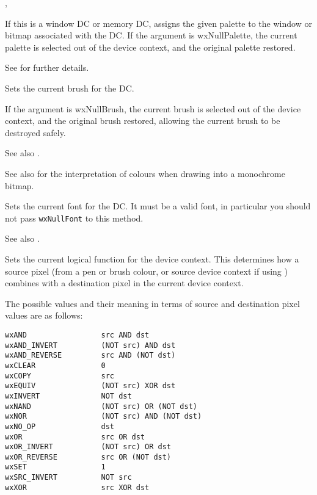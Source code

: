 
, 

\label{wxdcsetpalette}


If this is a window DC or memory DC, assigns the given palette to the window
or bitmap associated with the DC. If the argument is wxNullPalette, the current
palette is selected out of the device context, and the original palette
restored.

See  for further details.

\label{wxdcsetbrush}


Sets the current brush for the DC.

If the argument is wxNullBrush, the current brush is selected out of the device
context, and the original brush restored, allowing the current brush to
be destroyed safely.

See also .

See also  for the interpretation of colours
when drawing into a monochrome bitmap.

\label{wxdcsetfont}


Sets the current font for the DC. It must be a valid font, in particular you
should not pass {\tt wxNullFont} to this method.

See also .

\label{wxdcsetlogicalfunction}


Sets the current logical function for the device context.  This determines how
a source pixel (from a pen or brush colour, or source device context if
using ) combines with a destination pixel in the
current device context.

The possible values
and their meaning in terms of source and destination pixel values are
as follows:

\begin{verbatim}
wxAND                 src AND dst
wxAND_INVERT          (NOT src) AND dst
wxAND_REVERSE         src AND (NOT dst)
wxCLEAR               0
wxCOPY                src
wxEQUIV               (NOT src) XOR dst
wxINVERT              NOT dst
wxNAND                (NOT src) OR (NOT dst)
wxNOR                 (NOT src) AND (NOT dst)
wxNO_OP               dst
wxOR                  src OR dst
wxOR_INVERT           (NOT src) OR dst
wxOR_REVERSE          src OR (NOT dst)
wxSET                 1
wxSRC_INVERT          NOT src
wxXOR                 src XOR dst
\end{verbatim}

